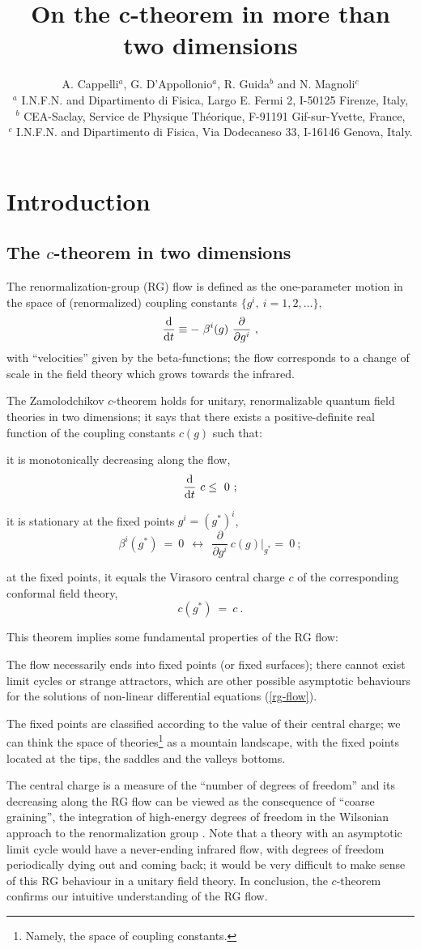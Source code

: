 \documentclass[proceedings]{JHEP}
\title{On the c-theorem in more than two dimensions
}
\author{
A. Cappelli${}^a$, G. D'Appollonio${}^a$, R. Guida${}^b$ and 
N. Magnoli${}^c$
\\
${}^a$ I.N.F.N. and Dipartimento di Fisica, 
Largo E. Fermi 2, I-50125 Firenze, Italy,
\\ 
${}^b$ CEA-Saclay, Service de Physique Th\'eorique,
F-91191 Gif-sur-Yvette, France,
\\
${}^c$ I.N.F.N. and Dipartimento di Fisica, Via Dodecaneso 33, 
I-16146 Genova, Italy.
}
\newcommand{\beq}{\begin{equation}}
\newcommand{\eeq}{\end{equation}}
\def\b{\beta}
\begin{document}
  
 
\section{Introduction}

\subsection{The $c$-theorem in two dimensions}

The renormalization-group (RG) flow is defined as 
the one-parameter motion in the space of (renormalized) coupling constants
$\{g^i,\ i=1,2,\dots\}$,
\beq
\frac{\rm d}{{\rm d}t} \equiv 
-\ \b^i(g)\ \frac{\partial}{\partial g^i}\ ,
\label{rg-flow}\eeq
with ``velocities'' given by the beta-functions;
the flow corresponds to a change of scale in the field theory
which grows towards the infrared.

The Zamolodchikov $c$-theorem\cite{cth} holds for
unitary, renormalizable quantum field theories in two dimensions;
it says that there exists a positive-definite real function 
of the coupling constants $c(g)$ such that: 

it is monotonically decreasing along the flow,
\beq
\frac{\rm d}{{\rm d}t}\ c \le \ 0 \ ;
\label{mono}\eeq

it is stationary at the fixed points $g^i=(g^*)^i$,
\beq
\b^i(g^*)\ = \ 0 \ \ \leftrightarrow\ \ 
\frac{\partial}{\partial g^i}\ c(g)\Bigg\vert_{g^*} =\ 0\ ;
\label{stat}\eeq

at the fixed points, it equals the Virasoro central charge $c$ of the
corresponding conformal field theory,
\beq
c\left( g^*\right) \ = \ c\ .
\label{cstar}\eeq


This theorem implies some fundamental properties of the RG flow:

The flow necessarily ends into fixed points (or fixed surfaces); 
there cannot exist
limit cycles or strange attractors, which are other possible 
asymptotic behaviours for the solutions of
non-linear differential equations (\ref{rg-flow}).

The fixed points are classified according to the value
of their central charge; we can think the space of theories\footnote{
Namely, the space of coupling constants.}
as a mountain landscape, with
the fixed points located at the tips, the saddles and the 
 valleys bottoms.

The central charge is a measure of the ``number of degrees
of freedom'' and its decreasing along the RG flow can be
viewed as the consequence of ``coarse graining'', the
integration of high-energy degrees of freedom
in the Wilsonian approach to the renormalization group
\cite{kada}. 
Note that a theory with an asymptotic limit cycle would
have a never-ending infrared flow, with degrees
of freedom periodically dying out and coming back;
it would be very difficult to make sense of this RG behaviour
in a unitary field theory.
In conclusion, the $c$-theorem confirms our intuitive understanding 
of the RG flow.
\end{document}
